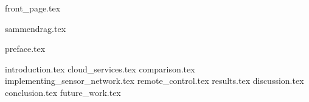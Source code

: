 \documentclass[usenames,dvipsnames, b5paper, twoside, openright]{report}
\begin{document}
%

{front_page.tex}


\setcounter{page}{1}
\setcounter{tocdepth}{3}


\let\cleardoublepage\clearpage
{sammendrag.tex}

\let\cleardoublepage\clearpage
{preface.tex}
\let\cleardoublepage\clearpage
\tableofcontents




\setcounter{page}{1}
\pagestyle{fancy}

\let\cleardoublepage\clearpage
{introduction.tex}
\let\cleardoublepage\clearpage
{cloud_services.tex}
\let\cleardoublepage\clearpage
{comparison.tex}
\let\cleardoublepage\clearpage
{implementing_sensor_network.tex}
\let\cleardoublepage\clearpage
{remote_control.tex}
\let\cleardoublepage\clearpage
{results.tex}
\let\cleardoublepage\clearpage
{discussion.tex}
\let\cleardoublepage\clearpage
{conclusion.tex}
\let\cleardoublepage\clearpage
{future_work.tex}

\let\cleardoublepage\clearpage

\begin{appendices}
\end{appendices}
\let\cleardoublepage\clearpage
{}
\let\cleardoublepage\clearpage

{}
\end{document}
